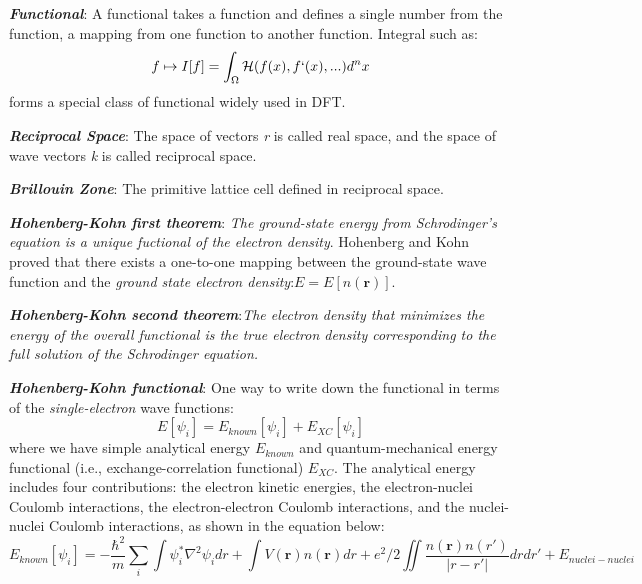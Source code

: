 \documentclass[12pt]{article}
\begin{document}
\textbf{\textit{Functional}}: A functional takes a function and defines a single number from the function, a mapping from one function to another function. Integral such as:
\begin{equation}
    f \mapsto I[f]=\int_\Omega \mathcal{H}(f(x),f`(x),...) d^nx
\end{equation}
forms a special class of functional widely used in DFT.

\textbf{\textit{Reciprocal Space}}: The space of vectors \emph{r} is called real space, and the space of wave vectors \emph{k} is called reciprocal space.

\textbf{\textit{Brillouin Zone}}: The primitive lattice cell defined in reciprocal space.

\textbf{\textit{Hohenberg-Kohn first theorem}}: \emph{The ground-state energy from Schrodinger's equation is a unique fuctional of the electron density}. Hohenberg and Kohn proved that there exists a one-to-one mapping between the ground-state wave function and the \textit{ground state electron density}:\textbf{$E=E[n(\boldsymbol{r})]$}.

\textbf{\textit{Hohenberg-Kohn second theorem}}:\textit{The electron density that minimizes the energy of the overall functional is the true electron density corresponding to the full solution of the Schrodinger equation.}

\textbf{\textit{Hohenberg-Kohn functional}}: One way to write down the functional in terms of the \textit{single-electron} wave functions:
\begin{equation}
    E[{\psi_i}]=E_{known}[{\psi_i}]+E_{XC}[{\psi_i}]
\end{equation}
where we have simple analytical energy $E_{known}$ and quantum-mechanical energy functional (i.e., exchange-correlation functional) $E_{XC}$. The analytical energy includes four contributions: the electron kinetic energies, the electron-nuclei Coulomb interactions, the electron-electron Coulomb interactions, and the nuclei-nuclei Coulomb interactions, as shown in the equation below:
\begin{equation}
    E_{known}[{\psi_i}]=-\frac{\hbar^2}{m}\sum_i\int\psi^*_i\nabla^2\psi_idr+\int V(\boldsymbol{r})n(\boldsymbol{r})dr+e^2/2\iint\frac{n(\boldsymbol{r})n(r')}{|r-r'|}drdr' + E_{nuclei-nuclei}
\end{equation}
\end{document}
